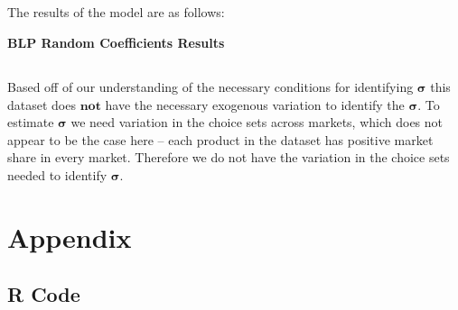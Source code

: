\documentclass[11pt]{article}
\begin{document}
\subsection{}

The results of the model are as follows:

\begin{center}
	\centering
	\textbf{BLP Random Coefficients Results}\par\medskip
	\scalebox{1}{
		
	}
\end{center}

\subsection{}
Based off of our understanding of the necessary conditions for identifying $\bm \sigma$ this dataset does $\textbf{not}$ have the necessary exogenous variation to identify the $\bm \sigma$. To estimate $\bm \sigma$ we need variation in the choice sets across markets, which does not appear to be the case here -- each product in the dataset has positive market share in every market. Therefore we do not have the variation in the choice sets needed to identify $\bm \sigma$.



\section{Appendix}
\subsection{R Code}





\end{document}
